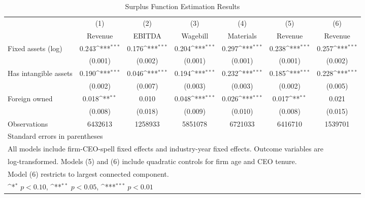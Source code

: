 \begin{table}[htbp]\centering
\def\sym#1{\ifmmode^{#1}\else\(^{#1}\)\fi}
\caption{Surplus Function Estimation Results}
\begin{tabular}{l*{6}{c}}
\toprule
                    &\multicolumn{1}{c}{(1)}&\multicolumn{1}{c}{(2)}&\multicolumn{1}{c}{(3)}&\multicolumn{1}{c}{(4)}&\multicolumn{1}{c}{(5)}&\multicolumn{1}{c}{(6)}\\
                    &\multicolumn{1}{c}{Revenue}&\multicolumn{1}{c}{EBITDA}&\multicolumn{1}{c}{Wagebill}&\multicolumn{1}{c}{Materials}&\multicolumn{1}{c}{Revenue}&\multicolumn{1}{c}{Revenue}\\
\midrule
Fixed assets (log)  &       0.243\sym{***}&       0.176\sym{***}&       0.204\sym{***}&       0.297\sym{***}&       0.238\sym{***}&       0.257\sym{***}\\
                    &     (0.001)         &     (0.002)         &     (0.001)         &     (0.001)         &     (0.001)         &     (0.002)         \\
\addlinespace
Has intangible assets&       0.190\sym{***}&       0.046\sym{***}&       0.194\sym{***}&       0.232\sym{***}&       0.185\sym{***}&       0.228\sym{***}\\
                    &     (0.002)         &     (0.007)         &     (0.003)         &     (0.003)         &     (0.002)         &     (0.005)         \\
\addlinespace
Foreign owned       &       0.018\sym{**} &       0.010         &       0.048\sym{***}&       0.026\sym{***}&       0.017\sym{**} &       0.021         \\
                    &     (0.008)         &     (0.018)         &     (0.009)         &     (0.010)         &     (0.008)         &     (0.015)         \\
\midrule
Observations        &     6432613         &     1258933         &     5851078         &     6721033         &     6416710         &     1539701         \\
\bottomrule
\multicolumn{7}{l}{\footnotesize Standard errors in parentheses}\\
\multicolumn{7}{l}{\footnotesize All models include firm-CEO-spell fixed effects and industry-year fixed effects. Outcome variables are}\\
\multicolumn{7}{l}{\footnotesize log-transformed. Models (5) and (6) include quadratic controls for firm age and CEO tenure.}\\
\multicolumn{7}{l}{\footnotesize Model (6) restricts to largest connected component.}\\
\multicolumn{7}{l}{\footnotesize \sym{*} \(p<0.10\), \sym{**} \(p<0.05\), \sym{***} \(p<0.01\)}\\
\end{tabular}
\end{table}
